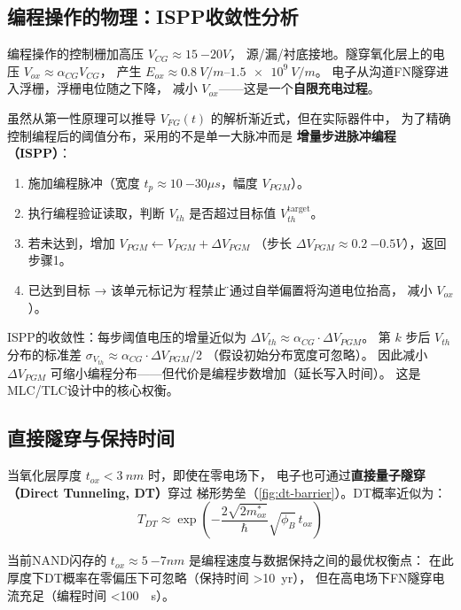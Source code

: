 \documentclass[11pt,a4paper,twoside]{article}
\theoremstyle{definition}
\theoremstyle{plain}
\theoremstyle{remark}
\begin{document}
\subsection{编程操作的物理：ISPP收敛性分析}

编程操作的控制栅加高压 $V_{CG} \approx \SI{15}{-20}{V}$，
源/漏/衬底接地。隧穿氧化层上的电压 $V_{ox} \approx \alpha_{CG} V_{CG}$，
产生 $E_{ox} \approx \SIrange{0.8}{1.5e9}{V/m}$。
电子从沟道FN隧穿进入浮栅，浮栅电位随之下降，
减小 $V_{ox}$——这是一个\textbf{自限充电过程}。

虽然从第一性原理可以推导 $V_{FG}(t)$ 的解析渐近式，但在实际器件中，
为了精确控制编程后的阈值分布，采用的不是单一大脉冲而是
\textbf{增量步进脉冲编程（ISPP）}：

\begin{enumerate}
  \item 施加编程脉冲（宽度 $t_p \approx \SI{10}{-30}{\mu s}$，幅度 $V_{PGM}$）。
  \item 执行编程验证读取，判断 $V_{th}$ 是否超过目标值 $V_{th}^{\text{target}}$。
  \item 若未达到，增加 $V_{PGM} \leftarrow V_{PGM} + \Delta V_{PGM}$
  （步长 $\Delta V_{PGM} \approx \SI{0.2}{-0.5}{V}$），返回步骤1。
  \item 已达到目标 → 该单元标记为\"编程禁止\"（通过自举偏置将沟道电位抬高，
  减小 $V_{ox}$）。
\end{enumerate}

ISPP的收敛性：每步阈值电压的增量近似为 $\Delta V_{th} \approx \alpha_{CG} \cdot \Delta V_{PGM}$。
第 $k$ 步后 $V_{th}$ 分布的标准差 $\sigma_{V_{th}} \approx \alpha_{CG} \cdot \Delta V_{PGM} / 2$
（假设初始分布宽度可忽略）。
因此减小 $\Delta V_{PGM}$ 可缩小编程分布——但代价是编程步数增加（延长写入时间）。
这是MLC/TLC设计中的核心权衡。

\subsection{直接隧穿与保持时间}

当氧化层厚度 $t_{ox} < \SI{3}{nm}$ 时，即使在零电场下，
电子也可通过\textbf{直接量子隧穿（Direct Tunneling, DT）}穿过
梯形势垒（\cref{fig:dt-barrier}）。DT概率近似为：
\begin{equation}
  T_{DT} \approx \exp\!\left( -\frac{2\sqrt{2m^*_{ox}}}{\hbar}
            \sqrt{\phi_B}\, t_{ox} \right)
\end{equation}

当前NAND闪存的 $t_{ox} \approx \SI{5}{-7}{nm}$ 是编程速度与数据保持之间的最优权衡点：
在此厚度下DT概率在零偏压下可忽略（保持时间 >\SI{10}{yr}），
但在高电场下FN隧穿电流充足（编程时间 <\SI{100}{\mu s}）。
\end{document}
